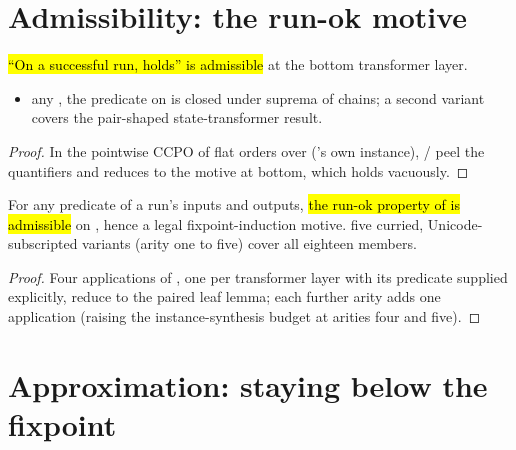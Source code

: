 \section{Admissibility: the run-ok motive}
\label{sec:run:adm}

\begin{lemma}
\label{lem:Erasure-est_admissible_ok}
\leanok
{}
 \hl{``On a successful run,  holds'' is admissible} at the bottom transformer
layer.
\begin{itemize}
\item {} any , the predicate
 on  is closed
under suprema of chains; a second variant covers the pair-shaped state-transformer result.
\end{itemize}
\end{lemma}
\begin{proof}
\leanok
{} In the pointwise CCPO of flat orders over  ('s own instance),
/ peel the quantifiers and
 reduces to the motive at bottom, which holds vacuously.
\end{proof}

\begin{lemma}
\label{lem:Erasure-eraseM_admissible_ok}
\leanok
{}
 For any predicate  of a run's inputs and outputs, \hl{the run-ok property of
 is admissible} on , hence a legal fixpoint-induction motive.
 five curried, Unicode-subscripted variants (arity one to five) cover all eighteen members.
\end{lemma}
\begin{proof}
\leanok
{}
 Four applications of , one per transformer layer with its
predicate supplied explicitly, reduce to the paired leaf lemma; each further arity adds one
application (raising the instance-synthesis budget at arities four and five).
\end{proof}

\section{Approximation: staying below the fixpoint}
\label{sec:run:approx}

